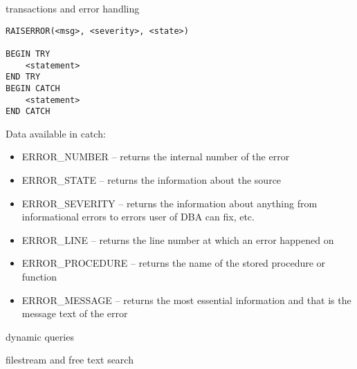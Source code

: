 \documentclass{article}
\begin{document}
\begin{section}{transactions and error handling}
\begin{lstlisting}
RAISERROR(<msg>, <severity>, <state>)

BEGIN TRY
    <statement>
END TRY
BEGIN CATCH
    <statement>
END CATCH
        \end{lstlisting}

        Data available in catch:
        \begin{itemize}
            \item ERROR\_NUMBER – returns the internal number of the error
            \item ERROR\_STATE – returns the information about the source
            \item ERROR\_SEVERITY – returns the information about anything from informational errors to errors 
                user of DBA can fix, etc.
            \item ERROR\_LINE – returns the line number at which an error happened on
            \item ERROR\_PROCEDURE – returns the name of the stored procedure or function
            \item ERROR\_MESSAGE – returns the most essential information and that is the message text of the error
        
        \end{itemize}
        

    \end{section}
    \begin{section}{dynamic queries}
    
    \end{section}
    \begin{section}{filestream and free text search}
    
    \end{section}
\end{document}
